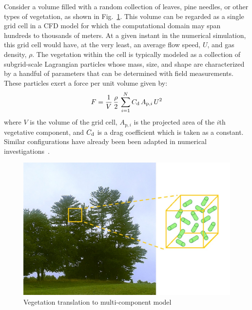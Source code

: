 \documentclass[12pt]{article}
\begin{document}
Consider a volume filled with a random collection of leaves, pine needles, or other types of vegetation, as shown in Fig.~\ref{fig:Canopymod}. This volume can be regarded as a single grid cell in a CFD model for which the computational domain may span hundreds to thousands of meters. At a given instant in the numerical simulation, this grid cell would have, at the very least, an average flow speed, $U$, and gas density, $\rho$.  The vegetation within the cell is typically modeled as a collection of subgrid-scale Lagrangian particles whose mass, size, and shape are characterized by a handful of parameters that can be determined with field measurements. These particles exert a force per unit volume given by:
\begin{equation}
\label{eq:DragForce}
F = \frac{1}{V} \, \frac{\rho}{2} \, \sum_{i=1}^N  C_{\rm d} \, A_{\mathrm{p},i} \, {U}^2
\end{equation}
where $V$ is the volume of the grid cell, $A_{\mathrm{p},i}$ is the projected area of the $i$th vegetative component, and $C_{\rm d}$ is a drag coefficient which is taken as a constant. Similar configurations have already been been adapted in numerical investigations~\cite{Pimont2009, Dupont2008}.
\begin{figure}[!ht]
	\centering 	\includegraphics[width=1.0\linewidth]{Picture1.jpg}
	\caption{Vegetation translation to multi-component model}
	\label{fig:Canopymod}
\end{figure}
\end{document}
